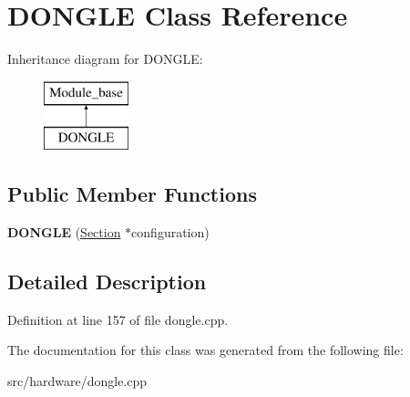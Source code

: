 \hypertarget{classDONGLE}{\section{D\-O\-N\-G\-L\-E Class Reference}
\label{classDONGLE}
}
Inheritance diagram for D\-O\-N\-G\-L\-E\-:\begin{figure}[H]
\begin{center}
\leavevmode
\includegraphics[height=2.000000cm]{classDONGLE}
\end{center}
\end{figure}
\subsection*{Public Member Functions}
\begin{DoxyCompactItemize}
\item 
\hypertarget{classDONGLE_afb3fbec00c866f3b468329b81f4c4c35}{{\bfseries D\-O\-N\-G\-L\-E} (\hyperlink{classSection}{Section} $\ast$configuration)}\label{classDONGLE_afb3fbec00c866f3b468329b81f4c4c35}

\end{DoxyCompactItemize}


\subsection{Detailed Description}


Definition at line 157 of file dongle.\-cpp.



The documentation for this class was generated from the following file\-:\begin{DoxyCompactItemize}
\item 
src/hardware/dongle.\-cpp\end{DoxyCompactItemize}
